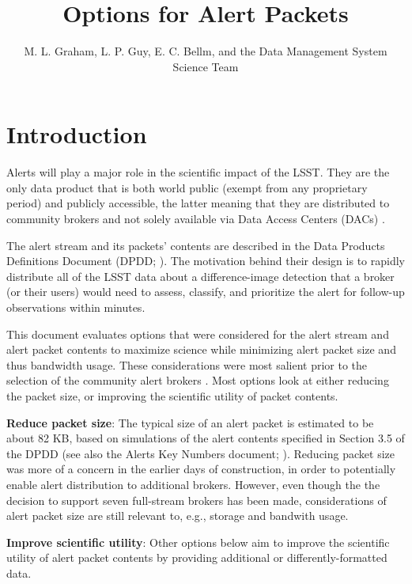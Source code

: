 \documentclass[DM,authoryear,toc]{lsstdoc}
\title{Options for Alert Packets}
\author{%
M. L. Graham, L. P. Guy, E. C. Bellm, and the Data Management System Science Team
}
\date{\vcsDate}
\begin{document}
\maketitle


\section{Introduction}\label{sec:introduction}

Alerts will play a major role in the scientific impact of the LSST.
They are the only data product that is both world public (exempt from any proprietary period) and publicly accessible,
the latter meaning that they are distributed to community brokers and not solely available via Data Access Centers (DACs) .

The alert stream and its packets' contents are described in the Data Products Definitions Document (DPDD; ).
The motivation behind their design is to rapidly distribute all of the LSST data about a difference-image detection that a 
broker (or their users) would need to assess, classify, and prioritize the alert for follow-up observations within minutes.

This document evaluates options that were considered for the alert stream and alert packet contents to maximize science while minimizing alert packet size and thus bandwidth usage.
These considerations were most salient prior to the selection of the community alert brokers .
Most options look at either reducing the packet size, or improving the scientific utility of packet contents.

\textbf{Reduce packet size}:
The typical size of an alert packet is estimated to be about 82 KB, based on simulations of the alert contents specified in Section 3.5 of the DPDD 
(see also the Alerts Key Numbers document; ).
Reducing packet size was more of a concern in the earlier days of construction, in order to potentially enable alert 
distribution to additional brokers.
However, even though the the decision to support seven full-stream brokers has been made, considerations of alert packet 
size are still relevant to, e.g., storage and bandwith usage.

\textbf{Improve scientific utility}:
Other options below aim to improve the scientific utility of alert packet contents by providing additional or 
differently-formatted data.
\end{document}

